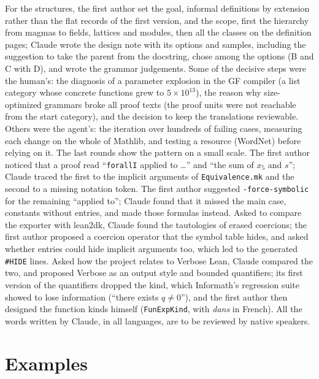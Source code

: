 \documentclass{easychair}
\newcommand{\ttt}[1]{\texttt{#1}}
\begin{document}
For the structures, the first author set the goal, informal definitions by extension rather
than the flat records of the first version, and the scope, first the hierarchy from magmas to
fields, lattices and modules, then all the classes on the definition pages; Claude wrote the
design note with its options and samples, including the suggestion to take the parent from
the docstring, chose among the options (B and C with D), and wrote the grammar judgements. Some of the decisive steps were the human's: the diagnosis of a parameter explosion in the GF
compiler (a list category whose concrete functions grew to $5 \times 10^{13}$), the reason why
size-optimized grammars broke all proof texts (the proof units were not reachable from the start
category), and the decision to keep the translations reviewable. Others were the agent's:
the iteration over hundreds of failing cases, measuring each change on the whole of Mathlib, and
testing a resource (WordNet) before relying on it. The last rounds show the pattern on a small
scale. The first author noticed that a proof read ``\ttt{forallI} applied to \ldots'' and ``the
sum of $x_5$ and $s$''; Claude traced the first to the implicit arguments of
\ttt{Equivalence.mk} and the second to a missing notation token. The first author suggested
\ttt{-force-symbolic} for the remaining ``applied to''; Claude found that it missed the main case,
constants without entries, and made those formulas instead. Asked to compare the exporter with
lean2dk, Claude found the tautologies of erased coercions; the first author proposed a coercion
operator that the symbol table hides, and asked whether entries could hide implicit arguments
too, which led to the generated \ttt{\#HIDE} lines. Asked how the project relates to Verbose
Lean, Claude compared the two, and proposed Verbose as an output style and bounded quantifiers;
its first version of the quantifiers dropped the kind, which Informath's regression suite showed
to lose information (``there exists $q \neq 0$''), and the first author then designed the
function kinds himself (\ttt{FunExpKind}, with \emph{dans} in French). All the words written by
Claude, in all
languages, are to be reviewed by native speakers.

\section{Examples}
\label{sec:examples}
\end{document}
